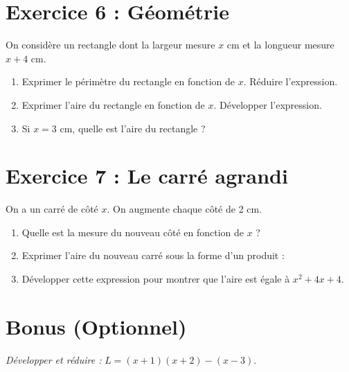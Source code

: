 \documentclass[11pt,a4paper]{article}
\begin{document}
\section*{Exercice 6 : Géométrie}
On considère un rectangle dont la largeur mesure $x$ cm et la longueur mesure $x + 4$ cm.
\begin{enumerate}
    \item Exprimer le périmètre du rectangle en fonction de $x$. Réduire l'expression. \\
    \dotfill
    \item Exprimer l'aire du rectangle en fonction de $x$. Développer l'expression. \\
    \dotfill
    \item Si $x = 3$ cm, quelle est l'aire du rectangle ? \\
    \dotfill
\end{enumerate}

\section*{Exercice 7 : Le carré agrandi}
On a un carré de côté $x$. On augmente chaque côté de 2 cm.
\begin{enumerate}
    \item Quelle est la mesure du nouveau côté en fonction de $x$ ? \dotfill
    \item Exprimer l'aire du nouveau carré sous la forme d'un produit : \dotfill
    \item Développer cette expression pour montrer que l'aire est égale à $x^2 + 4x + 4$. \\
    \dotfill
\end{enumerate}

\section*{Bonus (Optionnel)}
\textit{Développer et réduire :} $L = (x + 1)(x + 2) - (x - 3)$. \\
\dotfill
\end{document}

